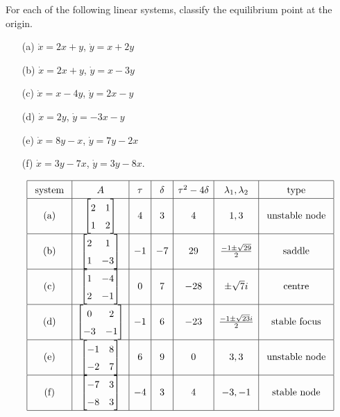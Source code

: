 \documentclass[a4paper]{amsart}
\begin{document}
\begin{exercise}\label{ex-linear-equilibria}
 For each of the following linear systems, classify the equilibrium
 point at the origin.
 \begin{itemize}
  \item[(a)] $\dot{x}=2x+y$, $\dot{y}=x+2y$
  \item[(b)] $\dot{x}=2x+y$, $\dot{y}=x-3y$
  \item[(c)] $\dot{x}=x-4y$, $\dot{y}=2x-y$
  \item[(d)] $\dot{x}=2y$,   $\dot{y}=-3x-y$
  \item[(e)] $\dot{x}=8y-x$, $\dot{y}=7y-2x$
  \item[(f)] $\dot{x}=3y-7x$, $\dot{y}=3y-8x$.
 \end{itemize}
\end{exercise}
\begin{solution}
 \[ \renewcommand{\arraystretch}{1.5}
    \begin{array}{|c|c|c|c|c|c|c|} \hline
     \text{ system } & A & \tau & \dl & \tau^2-4\dl & \lm_1,\lm_2 & \text{ type } \\ \hline
     \text{(a)} & \bbm  2& 1\\ 1& 2\ebm &  4 &  3 &   4 & 1,3 & \text{ unstable node } \\ \hline
     \text{(b)} & \bbm  2& 1\\ 1&-3\ebm & -1 & -7 &  29 & \frac{-1\pm\sqrt{29}}{2} & \text{ saddle } \\ \hline
     \text{(c)} & \bbm  1&-4\\ 2&-1\ebm &  0 &  7 & -28 & \pm\sqrt{7}i & \text{ centre } \\ \hline
     \text{(d)} & \bbm  0& 2\\-3&-1\ebm & -1 &  6 & -23 & \frac{-1\pm\sqrt{23}i}{2} & \text{ stable focus } \\ \hline
     \text{(e)} & \bbm -1& 8\\-2& 7\ebm &  6 &  9 &   0 & 3,3 & \text{ unstable node } \\ \hline
     \text{(f)} & \bbm -7& 3\\-8& 3\ebm & -4 &  3 &   4 & -3,-1 & \text{ stable node } \\ \hline
    \end{array}
 \]
\end{solution}
\end{document}
